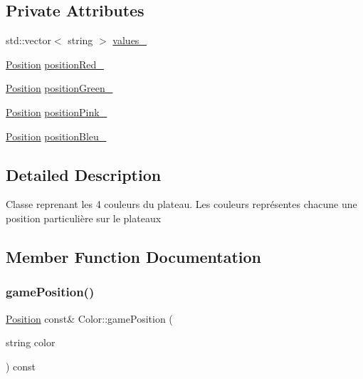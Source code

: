 \subsection*{Private Attributes}
\begin{DoxyCompactItemize}
\item 
std\+::vector$<$ string $>$ \mbox{\hyperlink{class_color_af6efd828cb7e03d6b4e92f2a0da7f981}{values\+\_\+}}
\item 
\mbox{\hyperlink{class_position}{Position}} \mbox{\hyperlink{class_color_ae00f2413fff1249e37d0daad72ad12b0}{position\+Red\+\_\+}}
\item 
\mbox{\hyperlink{class_position}{Position}} \mbox{\hyperlink{class_color_a670c8d42b6eb3fa43a2fea9976fa72a9}{position\+Green\+\_\+}}
\item 
\mbox{\hyperlink{class_position}{Position}} \mbox{\hyperlink{class_color_a5c5373fae2631ba096a2b18a0680dcc0}{position\+Pink\+\_\+}}
\item 
\mbox{\hyperlink{class_position}{Position}} \mbox{\hyperlink{class_color_a46d0d39d9c76652c959ad76412519307}{position\+Bleu\+\_\+}}
\end{DoxyCompactItemize}


\subsection{Detailed Description}
Classe reprenant les 4 couleurs du plateau. Les couleurs représentes chacune une position particulière sur le plateaux 

\subsection{Member Function Documentation}
\mbox{\label{class_color_a3ed137f01f42dd119231203ad018fa68}} 
\subsubsection{\texorpdfstring{gamePosition()}{gamePosition()}}
{\footnotesize\ttfamily \mbox{\hyperlink{class_position}{Position}} const\& Color\+::game\+Position (\begin{DoxyParamCaption}\item[{string}]{color }\end{DoxyParamCaption}) const\hspace{0.3cm}{\ttfamily [inline]}}

